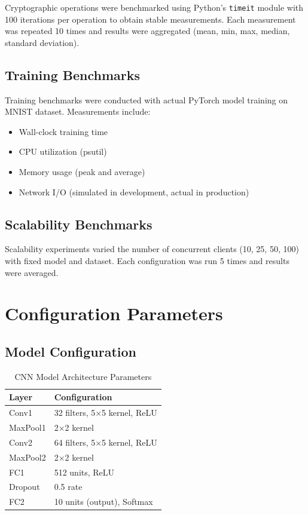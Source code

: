 \documentclass[12pt,a4paper]{article}
\begin{document}
Cryptographic operations were benchmarked using Python's \texttt{timeit} module with 100 iterations per operation to obtain stable measurements. Each measurement was repeated 10 times and results were aggregated (mean, min, max, median, standard deviation).

\subsection{Training Benchmarks}

Training benchmarks were conducted with actual PyTorch model training on MNIST dataset. Measurements include:
\begin{itemize}
    \item Wall-clock training time
    \item CPU utilization (psutil)
    \item Memory usage (peak and average)
    \item Network I/O (simulated in development, actual in production)
\end{itemize}

\subsection{Scalability Benchmarks}

Scalability experiments varied the number of concurrent clients (10, 25, 50, 100) with fixed model and dataset. Each configuration was run 5 times and results were averaged.

\section{Configuration Parameters}
\label{appendix:config}

\subsection{Model Configuration}

\begin{table}[H]
\centering
\caption{CNN Model Architecture Parameters}
\begin{tabular}{ll}
\toprule
\textbf{Layer} & \textbf{Configuration} \\
\midrule
Conv1 & 32 filters, 5×5 kernel, ReLU \\
MaxPool1 & 2×2 kernel \\
Conv2 & 64 filters, 5×5 kernel, ReLU \\
MaxPool2 & 2×2 kernel \\
FC1 & 512 units, ReLU \\
Dropout & 0.5 rate \\
FC2 & 10 units (output), Softmax \\
\bottomrule
\end{tabular}
\end{table}
\end{document}
